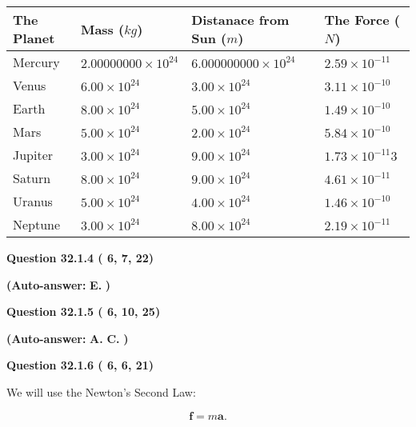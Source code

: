 \documentclass[12pt]{article}
\begin{document}
 
\begin{tabular}{|l|l|l|l|}
\hline
The Planet & Mass ($kg$) & Distanace from Sun ($m$) & The Force ($N$)\\
\hline
Mercury  &
           $ %
2.00000000 \times 10^{24}  $   &
             $ %
6.000000000 \times 10^{24}$    & $ %
2.59 \times 10^{-11} $
\\  \hline
Venus    &
           $  %
6.00 \times 10^{24}  $     &
             $ %
3.00 \times 10^{24} $    & $ %
3.11 \times 10^{-10} $
\\  \hline
Earth    &
           $  %
8.00 \times 10^{24}$     &
             $ %
5.00 \times 10^{24} $    & $ %
1.49 \times 10^{-10} $
\\   \hline
Mars     &
           $  %
5.00 \times 10^{24} $     &
             $ %
2.00 \times 10^{24}$    & $ %
5.84 \times 10^{-10} $
\\   \hline
Jupiter  &
           $  %
3.00 \times 10^{24}  $    &
             $ %
9.00 \times 10^{24} $    & $ %
1.73 \times 10^{-11}3 $
\\  \hline
Saturn   &
           $  %
8.00 \times 10^{24}   $    &
             $ %
9.00 \times 10^{24}  $    & $ %
4.61 \times 10^{-11} $
\\  \hline
Uranus   &
           $  %
5.00 \times 10^{24} $    &
             $ %
4.00 \times 10^{24}$    & $ %
1.46 \times 10^{-10} $
\\  \hline
Neptune  &
           $  %
3.00 \times 10^{24}  $    &
             $ %
8.00 \times 10^{24} $    & $ %
2.19 \times 10^{-11} $
\\  \hline
 
\end{tabular}
 
 
  
  
{\textbf{\large{Question
32.1.4 
 (          6,          7,         22)
}}}
 
 
{\textbf{(Auto-answer:}}
{\textbf{\large{
E.}}}
{\textbf{)}}
 
 
  
  
{\textbf{\large{Question
32.1.5 
 (          6,         10,         25)
}}}
 
 
{\textbf{(Auto-answer:}}
{\textbf{\large{
A.}}}
{\textbf{\large{
C.}}}
{\textbf{)}}
 
 
  
  
{\textbf{\large{Question
32.1.6 
 (          6,          6,         21)
}}}

We will use the Newton's Second Law:
 
\[
\mathbf{f}=m\mathbf{a}.
\]
 
\end{document}
